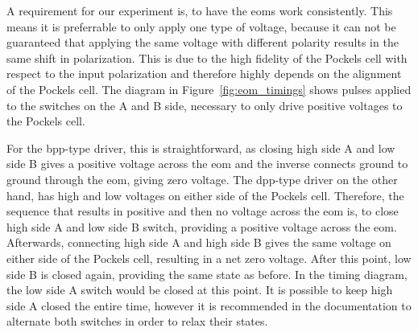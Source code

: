 \begin{figure}[t]%
\end{figure}

A requirement for our experiment is, to have the \acp{eom} work consistently. This means it is preferrable to only apply one type of voltage, because it can not be guaranteed that applying the same voltage with different polarity results in the same shift in polarization. This is due to the high fidelity of the Pockels cell with respect to the input polarization and therefore highly depends on the alignment of the Pockels cell. The diagram in Figure~\ref{fig:eom_timings} shows pulses applied to the switches on the A and B side, necessary to only drive positive voltages to the Pockels cell.

For the bpp-type driver, this is straightforward, as closing high side A and low side B gives a positive voltage across the \ac{eom} and the inverse connects ground to ground through the \ac{eom}, giving zero voltage. The dpp-type driver on the other hand, has high and low voltages on either side of the Pockels cell. Therefore, the sequence that results in positive and then no voltage across the \ac{eom} is, to close high side A and low side B switch, providing a positive voltage across the \ac{eom}. Afterwards, connecting high side A and high side B gives the same voltage on either side of the Pockels cell, resulting in a net zero voltage. After this point, low side B is closed again, providing the same state as before. In the timing diagram, the low side A switch would be closed at this point. It is possible to keep high side A closed the entire time, however it is recommended in the documentation to alternate both switches in order to relax their states.

\begin{figure}[t]%
\end{figure}


